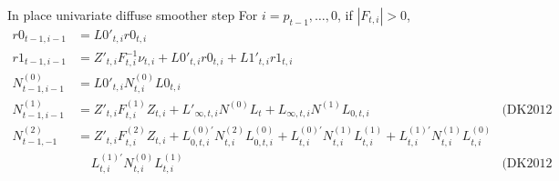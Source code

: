 \documentclass{article}
\begin{document}
In place univariate diffuse smoother step
For $i = p_{t-1},\ldots,0$, if $|F_{t,i}| > 0$,
\begin{align*}
  r0_{t-1,i-1} &= L0'_{t,i}r0_{t,i} \\
  r1_{t-1,i-1} &= Z'_{t,i}F^{-1}_{t,i}\nu_{t,i} +
                 L0'_{t,i}r0_{t,i} + L1'_{t,i}r1_{t,i} \\
  N^{(0)}_{t-1,i-1} &= L0'_{t,i}N^{(0)}_{t,i}L0_{t,i}\\
  N^{(1)}_{t-1,i-1} &= Z'_{t,i}F^{(1)}_{t,i}Z_{t,i} + L'_{\infty,t,i}N^{(0)}L_t
                  +L_{\infty,t,i}N^{(1)}L_{0,t,i}
                  & \mbox{(DK2012 5.29)}\\
  N^{(2)}_{t-1,-1} &= Z'_{t,i}F^{(2)}_{t,i}Z_{t,i} + L^{(0)'}_{0,t,i}N^{(2)}_{t,i}L^{(0)}_{0,t,i} +
                  L^{(0)'}_{t,i}N^{(1)}_{t,i}L^{(1)}_{t,i} +
                  L^{(1)'}_{t,i}N^{(1)}_{t,i}L^{(0)}_{t,i} \\
  &\;\;\;\;  L^{(1)'}_{t,i}N^{(0)}_{t,i}L^{(1)}_{t,i} & \mbox{(DK2012 5.29)}\\
\end{align*}
\end{document}

